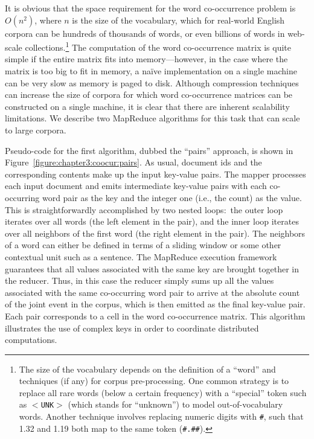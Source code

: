 It is obvious that the space requirement for the word co-occurrence
problem is $O(n^2)$, where $n$ is the size of the vocabulary, which
for real-world English corpora can be hundreds of thousands of words,
or even billions of words in web-scale collections.\footnote{The size
  of the vocabulary depends on the definition of a ``word'' and
  techniques (if any) for corpus pre-processing.  One common strategy
  is to replace all rare words (below a certain frequency) with a
  ``special'' token such as {\tt $<$UNK$>$} (which stands for
  ``unknown'') to model out-of-vocabulary words.  Another technique
  involves replacing numeric digits with {\tt \#}, such that 1.32 and
  1.19 both map to the same token ({\tt \#.\#\#}).}  The computation
of the word co-occurrence matrix is quite simple if the entire matrix
fits into memory---however, in the case where the matrix is too big to
fit in memory, a na\"{i}ve implementation on a single machine can be
very slow as memory is paged to disk.  Although compression techniques
can increase the size of corpora for which word co-occurrence matrices
can be constructed on a single machine, it is clear that there are
inherent scalability limitations.  We describe two MapReduce
algorithms for this task that can scale to large corpora.

Pseudo-code for the first algorithm, dubbed the ``pairs'' approach, is
shown in Figure~\ref{figure:chapter3:coocur:pairs}.  As usual,
document ids and the corresponding contents make up the input
key-value pairs.  The mapper processes each input document and emits
intermediate key-value pairs with each co-occurring word pair as the
key and the integer one (i.e., the count) as the value.  This is
straightforwardly accomplished by two nested loops:\ the outer loop
iterates over all words (the left element in the pair), and the inner
loop iterates over all neighbors of the first word (the right element
in the pair).  The neighbors of a word can either be defined in terms
of a sliding window or some other contextual unit such as a sentence.
The MapReduce execution framework guarantees that all values
associated with the same key are brought together in the reducer.
Thus, in this case the reducer simply sums up all the values
associated with the same co-occurring word pair to arrive at the
absolute count of the joint event in the corpus, which is then emitted
as the final key-value pair. Each pair corresponds to a cell in the
word co-occurrence matrix.  This algorithm illustrates the use of
complex keys in order to coordinate distributed computations.


